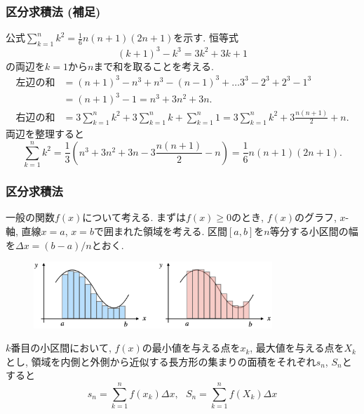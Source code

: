 \documentclass[dvipdfmx,cjk,10.2pt]{beamer}
\theoremstyle{definition}
\begin{document}


\begin{frame}
\frametitle{区分求積法 (補足)}

公式$\displaystyle \sum_{k=1}^n k^2=  \frac{1}{6}n(n+1)(2n+1)$を示す. 恒等式
$$
(k+1)^3-k^3=3k^2+3k+1
$$
の両辺を$k=1$から$n$まで和を取ることを考える. 
\begin{align*}
\text{左辺の和} & = (n+1)^3-n^3+n^3-(n-1)^3+\dots3^3-2^3+2^3-1^3\\
& = (n+1)^3-1=n^3+3n^2+3n. \\
\text{右辺の和} &= 3\sum_{k=1}^n k^2+3\sum_{k=1}^n k+\sum_{k=1}^n 1=  3\sum_{k=1}^n k^2+3\frac{n(n+1)}{2}+n. 
\end{align*}
両辺を整理すると
$$
\sum_{k=1}^n k^2 = \frac{1}{3}(n^3+3n^2+3n-3\frac{n(n+1)}{2}-n)
=  \frac{1}{6}n(n+1)(2n+1). 
$$

\end{frame}




\begin{frame}
\frametitle{区分求積法}

一般の関数$f(x)$について考える. 
まずは$f(x) \ge 0$のとき, $f(x)$のグラフ, $x$-軸, 直線$x=a$, $x=b$で囲まれた領域を考える. 
区間$[a,b]$を$n$等分する小区間の幅を$\Delta x = (b-a)/n$とおく. 

\vspace{-2mm}

\begin{figure}[htbp]
 \begin{center} 
  \includegraphics[width=90mm]{RiemannSum3.png}
 \end{center}
\end{figure}

\vspace{-2mm}


$k$番目の小区間において, $f(x)$の最小値を与える点を$x_k$, 最大値を与える点を$X_k$とし, 
領域を内側と外側から近似する長方形の集まりの面積をそれぞれ$s_n$, $S_n$とすると
$$
s_n=\sum_{k=1}^nf(x_k)\Delta x, \ \ \ S_n=\sum_{k=1}^nf(X_k)\Delta x
$$




\end{frame}
\end{document}
